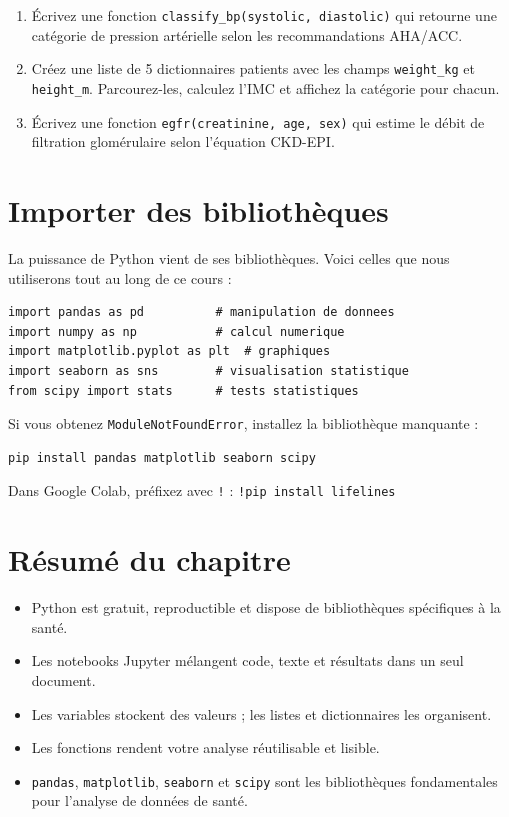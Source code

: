 \begin{exercise}
\begin{enumerate}
  \item \'Ecrivez une fonction \texttt{classify\_bp(systolic, diastolic)} qui retourne une cat\'egorie de pression art\'erielle selon les recommandations AHA/ACC.
  \item Cr\'eez une liste de 5 dictionnaires patients avec les champs \texttt{weight\_kg} et \texttt{height\_m}. Parcourez-les, calculez l'IMC et affichez la cat\'egorie pour chacun.
  \item \'Ecrivez une fonction \texttt{egfr(creatinine, age, sex)} qui estime le d\'ebit de filtration glom\'erulaire selon l'\'equation CKD-EPI.
\end{enumerate}
\end{exercise}

\section{Importer des biblioth\`eques}

La puissance de Python vient de ses biblioth\`eques. Voici celles que nous utiliserons tout au long de ce cours :

\begin{verbatim}
import pandas as pd          # manipulation de donnees
import numpy as np           # calcul numerique
import matplotlib.pyplot as plt  # graphiques
import seaborn as sns        # visualisation statistique
from scipy import stats      # tests statistiques
\end{verbatim}

\begin{warningbox}
Si vous obtenez \texttt{ModuleNotFoundError}, installez la biblioth\`eque manquante :
\begin{verbatim}
pip install pandas matplotlib seaborn scipy
\end{verbatim}
Dans Google Colab, pr\'efixez avec \texttt{!} : \texttt{!pip install lifelines}
\end{warningbox}

\section{R\'esum\'e du chapitre}

\begin{itemize}
  \item Python est gratuit, reproductible et dispose de biblioth\`eques sp\'ecifiques \`a la sant\'e.
  \item Les notebooks Jupyter m\'elangent code, texte et r\'esultats dans un seul document.
  \item Les variables stockent des valeurs ; les listes et dictionnaires les organisent.
  \item Les fonctions rendent votre analyse r\'eutilisable et lisible.
  \item \texttt{pandas}, \texttt{matplotlib}, \texttt{seaborn} et \texttt{scipy} sont les biblioth\`eques fondamentales pour l'analyse de donn\'ees de sant\'e.
\end{itemize}
